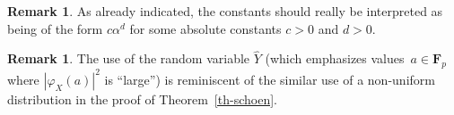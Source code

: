 \documentclass[12pt]{amsart}
\renewcommand{\geq}{\geqslant}
\numberwithin{equation}{section}
\newcommand{\Ff}{\mathbf{F}}
\newcommand{\proba}{\mathbf{P}}
\newcommand{\expect}{\mathbf{E}}
\renewcommand{\rho}{\varrho}
\theoremstyle{plain}
\theoremstyle{remark}
\theoremstyle{definition}
\newtheorem{remark}[theorem]{Remark}
\renewcommand{\geq}{\geqslant}
\begin{document}
\begin{remark}
  As already indicated, the constants should really be interpreted as
  being of the form $c\alpha^d$ for some absolute constants $c>0$ and
  $d>0$.
\end{remark}





\begin{remark}
  The use of the random variable $\widehat{Y}$ (which emphasizes
  values~$a\in\Ff_p$ where $|\varphi_X(a)|^2$ is ``large'') is
  reminiscent of the similar use of a non-uniform distribution in the
  proof of Theorem~\ref{th-schoen}.
\end{remark}
\end{document}
